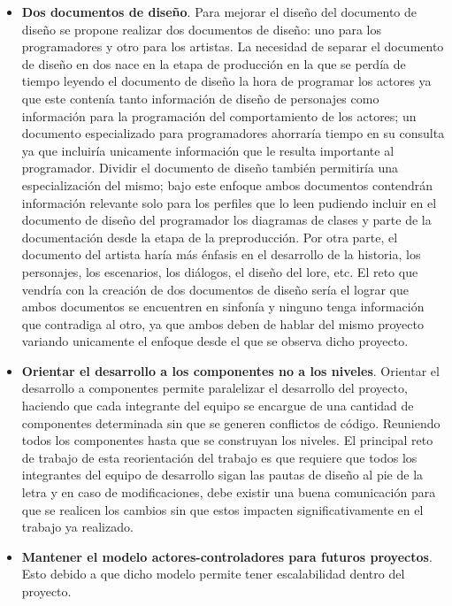 \begin{itemize}
	\item \textbf{Dos documentos de diseño}. Para mejorar el diseño del documento 
	de diseño se propone realizar dos documentos de diseño: uno para los programadores 
	y otro para los artistas. La necesidad de separar el documento de diseño en dos 
	nace en la etapa de producción en la que se perdía de tiempo leyendo el documento 
	de diseño la hora de programar los actores ya que este contenía tanto información 
	de diseño de personajes como información para la programación del comportamiento 
	de los actores; un documento especializado para programadores ahorraría tiempo 
	en su consulta ya que incluiría unicamente información que le resulta importante 
	al programador. Dividir el documento de diseño también permitiría una 
	especialización del mismo; bajo este enfoque ambos documentos contendrán 
	información relevante solo para los perfiles que lo leen pudiendo incluir en 
	el documento de diseño del programador los diagramas de clases y parte de la 
	documentación desde la etapa de la preproducción. Por otra parte, el documento 
	del artista haría más énfasis en el desarrollo de la historia, los personajes, 
	los escenarios, los diálogos, el diseño del lore, etc. El reto que vendría con 
	la creación de dos documentos de diseño sería el lograr que ambos documentos 
	se encuentren en sinfonía y ninguno tenga información que contradiga al otro, 
	ya que ambos deben de hablar del mismo proyecto variando unicamente el enfoque 
	desde el que se observa dicho proyecto.

	\item \textbf{Orientar el desarrollo a los componentes no a los niveles}. 
	Orientar el desarrollo a componentes permite paralelizar el desarrollo del 
	proyecto, haciendo que cada integrante del equipo se encargue de una cantidad 
	de componentes determinada sin que se generen conflictos de código. Reuniendo 
	todos los componentes hasta que se construyan los niveles. El principal reto 
	de trabajo de esta reorientación del trabajo es que requiere que todos los 
	integrantes del equipo de desarrollo sigan las pautas de diseño al pie de la 
	letra y en caso de modificaciones, debe existir una buena comunicación para que 
	se realicen los cambios sin que estos impacten significativamente en el trabajo 
	ya realizado.

	\item\textbf{Mantener el modelo actores-controladores para futuros proyectos}. 
	Esto debido a que dicho modelo permite tener escalabilidad dentro del proyecto.
\end{itemize}
